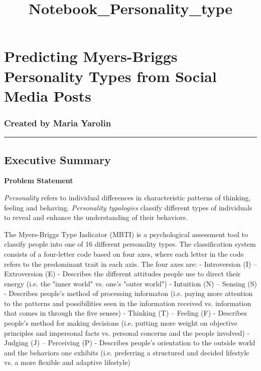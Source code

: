 \documentclass[11pt]{article}
\title{Notebook\_Personality\_type}
\begin{document}
    
    
    \maketitle
    
    

    
    \section{Predicting Myers-Briggs Personality Types from Social Media
Posts}\label{predicting-myers-briggs-personality-types-from-social-media-posts}

\subsubsection{Created by Maria Yarolin}\label{created-by-maria-yarolin}

    \begin{center}\rule{0.5\linewidth}{\linethickness}\end{center}

    \subsection{Executive Summary}\label{executive-summary}

\textbf{Problem Statement}

\emph{Personality} refers to individual differences in characteristic
patterns of thinking, feeling and behaving. \emph{Personality
typologies} classify different types of individuals to reveal and
enhance the understanding of their behaviors.

The Myers-Briggs Type Indicator (MBTI) is a psychological assessment
tool to classify people into one of 16 different personality types. The
classification system consists of a four-letter code based on four axes,
where each letter in the code refers to the predominant trait in each
axis. The four axes are: - Introversion (I) -- Extroversion (E) -
Describes the different attitudes people use to direct their energy
(i.e. the "inner world" vs. one's "outer world") - Intuition (N) --
Sensing (S) - Describes people's method of processing informaton (i.e.
paying more attention to the patterns and possibilities seen in the
information received vs. information that comes in through the five
senses) - Thinking (T) -- Feeling (F) - Describes people's method for
making decisions (i.e. putting more weight on objective principles and
impersonal facts vs. personal concerns and the people involved) -
Judging (J) -- Perceiving (P) - Describes people's orientation to the
outside world and the behaviors one exhibits (i.e. preferring a
structured and decided lifestyle vs. a more flexible and adaptive
lifestyle)
\end{document}
